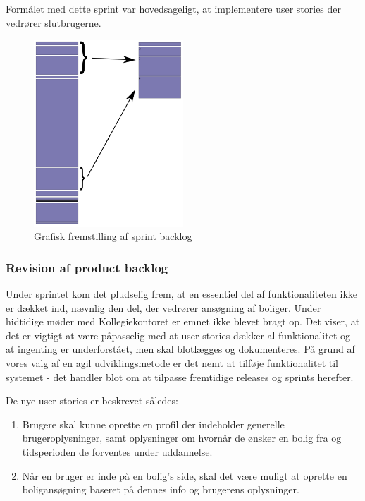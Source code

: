\documentclass[12pt, a4paper]{report}
\begin{document}
Formålet med dette sprint var hovedsageligt, at implementere user stories der vedrører slutbrugerne.

\begin{figure}
\includegraphics[width=0.5\textwidth]{sprint2log}
\caption{Grafisk fremstilling af sprint backlog}
\label{sprintlog1}
\end{figure}

\subsubsection{Revision af product backlog}

Under sprintet kom det pludselig frem, at en essentiel del af funktionaliteten ikke er dækket ind, nævnlig den del, der vedrører ansøgning af boliger. Under hidtidige møder med Kollegiekontoret er emnet ikke blevet bragt op. Det viser, at det er vigtigt at være påpasselig med at user stories dækker al funktionalitet og at ingenting er underforstået, men skal blotlægges og dokumenteres. På grund af vores valg af en agil udviklingsmetode er det nemt at tilføje funktionalitet til systemet - det handler blot om at tilpasse fremtidige releases og sprints herefter.

De nye user stories er beskrevet således:

\begin{enumerate}

\item Brugere skal kunne oprette en profil der indeholder generelle brugeroplysninger, samt oplysninger om hvornår de ønsker en bolig fra og tidsperioden de forventes under uddannelse.

\item Når en bruger er inde på en bolig’s side, skal det være muligt at oprette en boligansøgning baseret på dennes info og brugerens oplysninger.

\end{enumerate}
\end{document}
